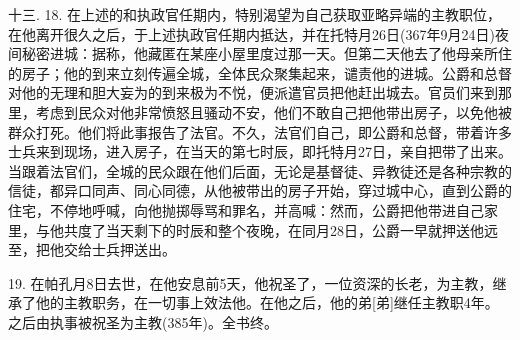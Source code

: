 十三. 18. 在上述的和执政官任期内，特别渴望为自己获取亚略异端的主教职位，在他离开很久之后，于上述执政官任期内抵达，并在托特月26日(367年9月24日)夜间秘密进城：据称，他藏匿在某座小屋里度过那一天。但第二天他去了他母亲所住的房子；他的到来立刻传遍全城，全体民众聚集起来，谴责他的进城。公爵和总督对他的无理和胆大妄为的到来极为不悦，便派遣官员把他赶出城去。官员们来到那里，考虑到民众对他非常愤怒且骚动不安，他们不敢自己把他带出房子，以免他被群众打死。他们将此事报告了法官。不久，法官们自己，即公爵和总督，带着许多士兵来到现场，进入房子，在当天的第七时辰，即托特月27日，亲自把带了出来。当跟着法官们，全城的民众跟在他们后面，无论是基督徒、异教徒还是各种宗教的信徒，都异口同声、同心同德，从他被带出的房子开始，穿过城中心，直到公爵的住宅，不停地呼喊，向他抛掷辱骂和罪名，并高喊：然而，公爵把他带进自己家里，与他共度了当天剩下的时辰和整个夜晚，在同月28日，公爵一早就押送他远至，把他交给士兵押送出。\par

19. 在帕孔月8日去世，在他安息前5天，他祝圣了，一位资深的长老，为主教，继承了他的主教职务，在一切事上效法他。在他之后，他的弟[弟]继任主教职4年。之后由执事被祝圣为主教(385年)。全书终。\par


